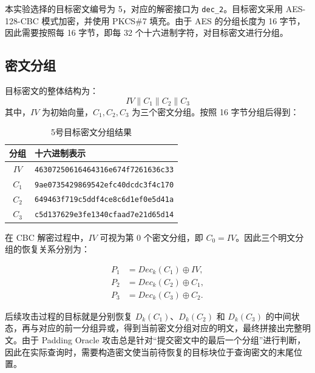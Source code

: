 本实验选择的目标密文编号为 5，对应的解密接口为 \verb|dec_2|。目标密文采用 AES-128-CBC 模式加密，并使用 PKCS\#7 填充。由于 AES 的分组长度为 16 字节，因此需要按照每 16 字节，即每 32 个十六进制字符，对目标密文进行分组。

\subsection{密文分组}

目标密文的整体结构为：
\[IV \parallel C_1 \parallel C_2 \parallel C_3\]
其中，$IV$ 为初始向量，$C_1,C_2,C_3$ 为三个密文分组。按照 16 字节分组后得到：

\begin{table}[H]
    \centering
    \caption{5号目标密文分组结果}
    \begin{tabular}{|c|l|}
        \hline
        分组 & 十六进制表示 \\
        \hline
        $IV$ & \texttt{46307250616464316e674f7261636c33} \\
        \hline
        $C_1$ & \texttt{9ae0735429869542efc40dcdc3f4c170} \\
        \hline
        $C_2$ & \texttt{649463f719c5ddf4ce8c6d1ef0e5d41a} \\
        \hline
        $C_3$ & \texttt{c5d137629e3fe1340cfaad7e21d65d14} \\
        \hline
    \end{tabular}
\end{table}

在 CBC 解密过程中，$IV$ 可视为第 0 个密文分组，即 $C_0 = IV$。因此三个明文分组的恢复关系分别为：

\begin{align}
    P_1 &= Dec_k(C_1) \oplus IV, \\
    P_2 &= Dec_k(C_2) \oplus C_1, \\
    P_3 &= Dec_k(C_3) \oplus C_2.
\end{align}

后续攻击过程的目标就是分别恢复 $D_k(C_1)$、$D_k(C_2)$ 和 $D_k(C_3)$ 的中间状态，再与对应的前一分组异或，得到当前密文分组对应的明文，最终拼接出完整明文。由于 Padding Oracle 攻击总是针对“提交密文中的最后一个分组”进行判断，因此在实际查询时，需要构造密文使当前待恢复的目标块位于查询密文的末尾位置。
